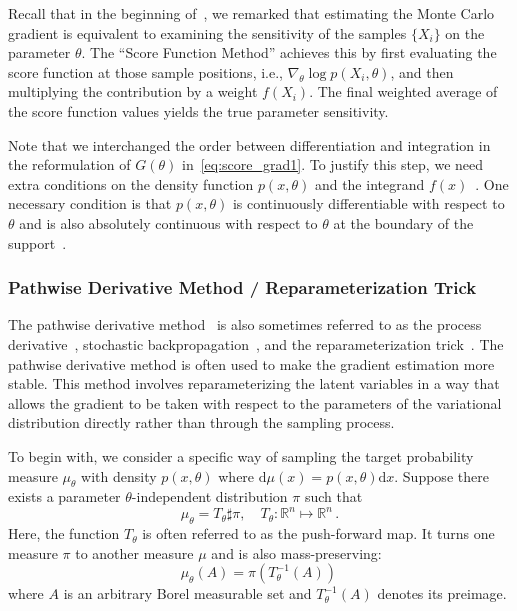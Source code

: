 \documentclass[12pt]{amsart}
\newcommand{\bbR}{\mathbb R} \newcommand{\bbS}{\mathbb S}
\newcommand{\rd}{\mathrm{d}}
\begin{document}
Recall that in the beginning of~, we remarked that estimating the Monte Carlo gradient is equivalent to examining the sensitivity of the samples $\{X_i\}$ on the parameter $\theta$. The ``Score Function Method'' achieves this by first evaluating the score function at those sample positions, i.e., $\nabla_\theta \log p (X_i,\theta)$, and then multiplying the contribution by a weight $f(X_i)$. The final weighted average of the score function values yields the true parameter sensitivity.


Note that we interchanged the order between differentiation and integration in the reformulation of $G(\theta)$ in~\eqref{eq:score_grad1}. To justify this step, we need extra conditions on the density function $p(x,\theta)$ and the integrand $f(x)$~\cite{l1995note,kleijnen1996optimization}. One necessary condition is that $p(x,\theta)$ is continuously differentiable with respect to $\theta$ and is also absolutely
continuous with respect to $\theta$ at the boundary of the support~\cite{pflug2012optimization,glasserman2013monte}.


\subsubsection{Pathwise Derivative Method / Reparameterization Trick}\label{subsubsec:pw_grad}
The pathwise derivative method~\cite{glasserman2013monte} is also sometimes referred to as the process derivative~\cite{pflug2012optimization,glasserman1990gradient}, stochastic backpropagation~\cite{rezende2014stochastic}, and the reparameterization trick~\cite{kingma2013auto}. The pathwise derivative method is often used to make the gradient estimation more stable. This method involves reparameterizing the latent variables in a way that allows the gradient to be taken with respect to the parameters of the variational distribution directly rather than through the sampling process.

To begin with, we consider a specific way of sampling the target probability measure  $\mu_\theta$ with density $p(x,\theta)$ where $\rd\mu(x) = p(x,\theta) \rd x$. Suppose there exists  a parameter $\theta$-independent distribution $\pi$ such that
\begin{equation}\label{eq:push-forward}
   \mu_\theta = T_\theta \sharp  \pi,\quad T_\theta: \bbR^n \mapsto \bbR^n\,.
\end{equation}
Here, the function $T_\theta$ is often referred to as the push-forward map. It turns one measure $\pi$ to another measure $\mu$ and is also mass-preserving: $$\mu_\theta(A) =\pi \left(T_\theta^{-1}(A) \right) \, $$ 
where $A$ is an arbitrary Borel measurable set and $T_\theta^{-1}(A)$ denotes its preimage. 
\end{document}
